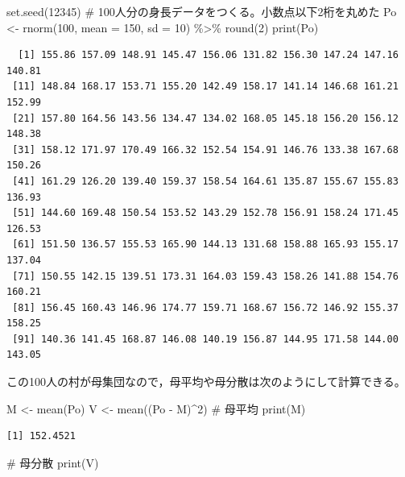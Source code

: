 \documentclass[
  a4paper,
]{ltjsbook}
\newenvironment{Shaded}{\begin{snugshade}}{\end{snugshade}}
\newcommand{\AttributeTok}[1]{\textcolor[rgb]{0.40,0.45,0.13}{#1}}
\newcommand{\CommentTok}[1]{\textcolor[rgb]{0.37,0.37,0.37}{#1}}
\newcommand{\DecValTok}[1]{\textcolor[rgb]{0.68,0.00,0.00}{#1}}
\newcommand{\FunctionTok}[1]{\textcolor[rgb]{0.28,0.35,0.67}{#1}}
\newcommand{\NormalTok}[1]{\textcolor[rgb]{0.00,0.23,0.31}{#1}}
\newcommand{\OtherTok}[1]{\textcolor[rgb]{0.00,0.23,0.31}{#1}}
\newcommand{\SpecialCharTok}[1]{\textcolor[rgb]{0.37,0.37,0.37}{#1}}
\begin{document}
\begin{Shaded}
\begin{Highlighting}[]
\FunctionTok{set.seed}\NormalTok{(}\DecValTok{12345}\NormalTok{)}
\CommentTok{\# 100人分の身長データをつくる。小数点以下2桁を丸めた}
\NormalTok{Po }\OtherTok{\textless{}{-}} \FunctionTok{rnorm}\NormalTok{(}\DecValTok{100}\NormalTok{, }\AttributeTok{mean =} \DecValTok{150}\NormalTok{, }\AttributeTok{sd =} \DecValTok{10}\NormalTok{) }\SpecialCharTok{\%\textgreater{}\%} \FunctionTok{round}\NormalTok{(}\DecValTok{2}\NormalTok{)}
\FunctionTok{print}\NormalTok{(Po)}
\end{Highlighting}
\end{Shaded}

\begin{verbatim}
  [1] 155.86 157.09 148.91 145.47 156.06 131.82 156.30 147.24 147.16 140.81
 [11] 148.84 168.17 153.71 155.20 142.49 158.17 141.14 146.68 161.21 152.99
 [21] 157.80 164.56 143.56 134.47 134.02 168.05 145.18 156.20 156.12 148.38
 [31] 158.12 171.97 170.49 166.32 152.54 154.91 146.76 133.38 167.68 150.26
 [41] 161.29 126.20 139.40 159.37 158.54 164.61 135.87 155.67 155.83 136.93
 [51] 144.60 169.48 150.54 153.52 143.29 152.78 156.91 158.24 171.45 126.53
 [61] 151.50 136.57 155.53 165.90 144.13 131.68 158.88 165.93 155.17 137.04
 [71] 150.55 142.15 139.51 173.31 164.03 159.43 158.26 141.88 154.76 160.21
 [81] 156.45 160.43 146.96 174.77 159.71 168.67 156.72 146.92 155.37 158.25
 [91] 140.36 141.45 168.87 146.08 140.19 156.87 144.95 171.58 144.00 143.05
\end{verbatim}

この100人の村が母集団なので，母平均や母分散は次のようにして計算できる。

\begin{Shaded}
\begin{Highlighting}[]
\NormalTok{M }\OtherTok{\textless{}{-}} \FunctionTok{mean}\NormalTok{(Po)}
\NormalTok{V }\OtherTok{\textless{}{-}} \FunctionTok{mean}\NormalTok{((Po }\SpecialCharTok{{-}}\NormalTok{ M)}\SpecialCharTok{\^{}}\DecValTok{2}\NormalTok{)}
\CommentTok{\# 母平均}
\FunctionTok{print}\NormalTok{(M)}
\end{Highlighting}
\end{Shaded}

\begin{verbatim}
[1] 152.4521
\end{verbatim}

\begin{Shaded}
\begin{Highlighting}[]
\CommentTok{\# 母分散}
\FunctionTok{print}\NormalTok{(V)}
\end{Highlighting}
\end{Shaded}
\end{document}
